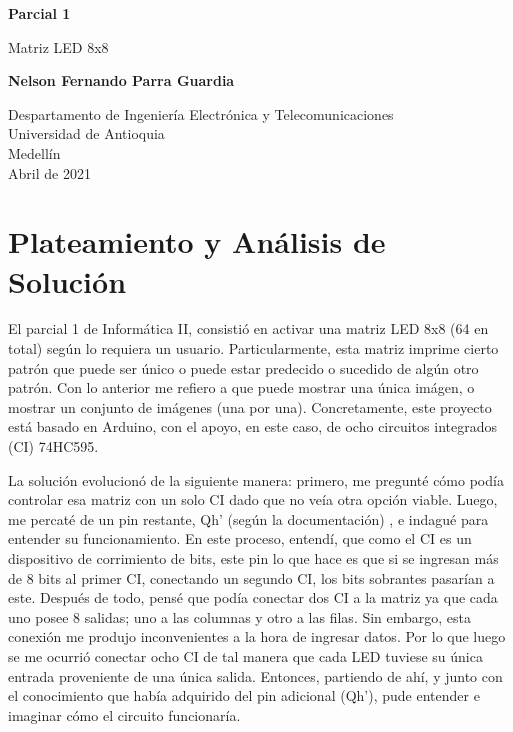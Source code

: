 \documentclass{article}
\begin{document}
\begin{titlepage}
    \begin{center}
        \vspace*{1cm}
            
        \Huge
        \textbf{Parcial 1}
            
        \vspace{0.5cm}
        \LARGE
        Matriz LED 8x8
            
        \vspace{1.5cm}
            
        \textbf{Nelson Fernando Parra Guardia}
            
        \vfill
            
        \vspace{0.8cm}
            
        \Large
        Despartamento de Ingeniería Electrónica y Telecomunicaciones\\
        Universidad de Antioquia\\
        Medellín\\
        Abril de 2021
            
    \end{center}
\end{titlepage}

\tableofcontents
\newpage

\section{Plateamiento y Análisis de Solución}\label{first}
\par El parcial 1 de Informática II, consistió en activar una matriz LED 8x8 (64 en total) según lo requiera un usuario. Particularmente, esta matriz imprime cierto patrón que puede ser único o puede estar predecido o sucedido de algún otro patrón. Con lo anterior me refiero a que puede mostrar una única imágen, o mostrar un conjunto de imágenes (una por una).  Concretamente, este proyecto está basado en Arduino, con el apoyo, en este caso, de ocho circuitos integrados (CI) 74HC595. \par La solución evolucionó de la siguiente manera: primero, me pregunté cómo podía controlar esa matriz con un solo CI dado que no veía otra opción viable. Luego, me percaté de un pin restante, Qh' (según la documentación) \cite{ci}, e indagué para entender su funcionamiento. En este proceso, entendí, que como el CI es un dispositivo de corrimiento de bits, este pin lo que hace es que si se ingresan más de 8 bits al primer CI, conectando un segundo CI, los bits sobrantes pasarían a este. Después de todo, pensé que podía conectar dos CI a la matriz ya que cada uno posee 8 salidas; uno a las columnas y otro a las filas. Sin embargo, esta conexión me produjo inconvenientes a la hora de ingresar datos. Por lo que luego se me ocurrió conectar ocho CI de tal manera que cada LED tuviese su única entrada proveniente de una única salida. Entonces, partiendo de ahí, y junto con el conocimiento que había adquirido del pin adicional (Qh'), pude entender e imaginar cómo el circuito funcionaría.
\end{document}
